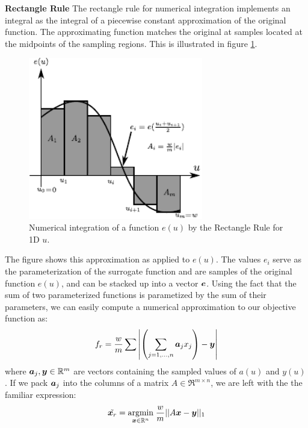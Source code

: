 \documentclass[9.5pt,journal,final,finalsubmission,twocolumn]{IEEEtran}
\begin{document}
{\bf Rectangle Rule} The rectangle rule for numerical integration implements an
integral as the integral of a piecewise constant approximation of the original
function.  The approximating function matches the original at samples located
at the midpoints of the sampling regions. This is illustrated in figure
\ref{fig:rectangle}.
\begin{figure}
 \centering
 \includegraphics[width=3in]{integration_rectangle_midpoint.pdf}
 \caption{Numerical integration of a function $e(u)$ by the Rectangle Rule for 1D $u$.}
 \label{fig:rectangle}
\end{figure}
The figure shows this approximation as applied to $e(u)$. The values $e_i$ serve as the parameterization of the surrogate function and are samples of the original function $e(u)$, and can be stacked up into a vector $\boldsymbol{e}$.  Using the fact that the sum of two parameterized functions is parametized by the sum of their parameters, we can easily compute a numerical approximation to our objective function as:
\begin{equation}\label{eqn:discrete1DBox}
f_r = \frac{w}{m} \sum{ \left|\left(\sum_{j=1,\ldots,n} \boldsymbol{a}_j x_j\right) - {\boldsymbol{y}}\right|}
\end{equation}
where $\boldsymbol{a}_j, {\boldsymbol{y}} \in \mathbb R^m$ are vectors containing the sampled values of $a(u)$ and $y(u)$.  If we pack $\boldsymbol{a}_j$ into the columns of a matrix $A \in \Re^{m \times n}$, we are left with the the familiar expression:
\begin{equation}\label{eqn:original_optimization}
\tilde{{\boldsymbol{x}}_r} = {\hbox{$\underset{{\boldsymbol{x}}\in \mathbb R^n}{\mbox{argmin}}\;$}} \frac{w}{m} || A {\boldsymbol{x}} - {\boldsymbol{y}} ||_1
\end{equation}
\end{document}
